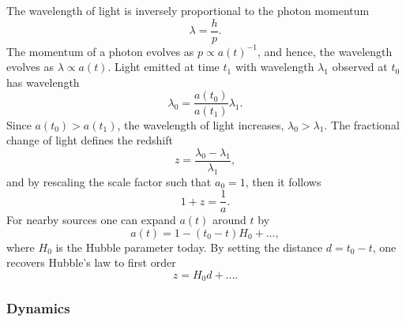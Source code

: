 The wavelength of light is inversely proportional to the photon momentum
%
\begin{equation}
	\lambda
	= \frac{h}{p}.
\end{equation}
%
The momentum of a photon evolves as \(p \propto {a(t)}^{-1}\), and hence, the wavelength evolves as \(\lambda \propto a(t)\).
Light emitted at time \(t_{1}\) with wavelength \(\lambda_{1}\) observed at \(t_{0}\) has wavelength
%
\begin{equation}
	\lambda_{0}
	= \frac{a(t_{0})}{a(t_{1})} \lambda_{1}.
\end{equation}
%
Since \(a(t_{0}) > a(t_{1})\), the wavelength of light increases, \ie{} \(\lambda_{0} > \lambda_{1}\).
The fractional change of light defines the redshift
%
\begin{equation}
	z
	= \frac{\lambda_{0} - \lambda_{1}}{\lambda_{1}},
\end{equation}
%
and by rescaling the scale factor such that \(a_{0}=1\), then it follows
%
\begin{equation}
	1 + z
	= \frac{1}{a}.
\end{equation}
%
For nearby sources one can expand \(a(t)\) around \(t\) by
%
\begin{equation}
	a(t)
	= 1 - (t_{0} - t)H_{0} + \ldots,
\end{equation}
%
where \(H_{0}\) is the Hubble parameter today.
By setting the distance \(d = t_{0} - t\), one recovers Hubble's law to first order
%
\begin{equation}
	z
	= H_{0}d + \ldots.
\end{equation}

\subsubsection{Dynamics}

